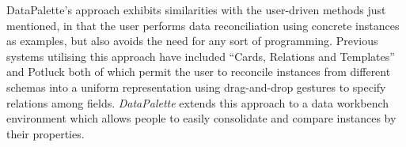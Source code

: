\documentclass{sigchi}
\begin{document}
DataPalette's approach exhibits similarities with the user-driven methods just mentioned, in that the user performs data reconciliation using concrete instances as examples, but also avoids the need for any sort of programming.  Previous systems utilising this approach have included ``Cards, Relations and Templates'' \cite{Dontcheva:2007:RCS:1294211.1294224} and Potluck \cite{citeulike:3875264} both of which permit the user to reconcile instances from different schemas into a uniform representation using drag-and-drop gestures to specify relations among fields.  \emph{DataPalette} extends this approach to a data workbench environment which allows people to easily consolidate and compare instances by their properties.






\end{document}
